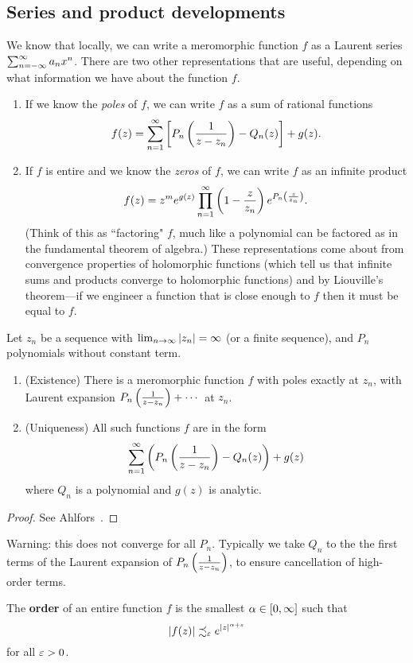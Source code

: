 \subsection{Series and product developments}
We know that locally, we can write a meromorphic function $f$ as a Laurent series $\sum_{n=-\infty}^{\infty} a_nx^n$. There are two other representations that are useful, depending on what information we have about the function $f$.
\begin{enumerate}
\item If we know the {\it poles} of $f$, we can write $f$ as a sum of rational functions
\[
f(z)=\sum_{n=1}^{\infty}\left[ { P_n\left( {\frac{1}{z-z_n}} \right) - Q_n(z)} \right]+g(z).
\]
\item If $f$ is entire and we know the {\it zeros} of $f$, we can write $f$ as an infinite product
\[
f(z)=z^me^{g(z)}\prod_{n=1}^{\infty}\left( {1-\frac{z}{z_n}} \right)e^{P_n\left( {\frac{z}{z_n}} \right)}.
\]
(Think of this as ``factoring" $f$, much like a polynomial can be factored as in the fundamental theorem of algebra.)
These representations come about from convergence properties of holomorphic functions (which tell us that infinite sums and products converge to holomorphic functions) and by Liouville's theorem---if we engineer a function that is close enough to $f$ then it must be equal to $f$.
\end{enumerate}
\begin{thm}
Let $z_n$ be a sequence with $\lim_{n\to \infty} |z_n|=\infty$ (or a finite sequence), and $P_n$ polynomials without constant term.
\begin{enumerate}
\item (Existence)
There is a meromorphic function $f$ with poles exactly at $z_n$, with Laurent expansion $P_n\left( {\frac{1}{z-z_n}} \right)+\cdots $ at $z_n$.
\item (Uniqueness)
All such functions $f$ are in the form
\[
\sum_{n=1}^{\infty} \left( {P_n\left( {\frac{1}{z-z_n}} \right)-Q_n(z)} \right)+g(z)
\]
where $Q_n$ is a polynomial and $g(z)$ is analytic.
\end{enumerate}
\end{thm}
\begin{proof}
See Ahlfors~\cite[p. 187]{Ah79}.
\end{proof}
Warning: this does not converge for all $P_n$. Typically we take $Q_n$ to the the first terms of the Laurent expansion of $P_n\left( {\frac{1}{z-z_n}} \right)$, to ensure cancellation of high-order terms.
\begin{df}
The \textbf{order} of an entire function $f$ is the smallest $\alpha\in [0,\infty]$ such that
\[
|f(z)|\precsim_{\varepsilon} e^{|z|^{\alpha+\varepsilon}}
\]
for all $\varepsilon>0$. 
\end{df}
